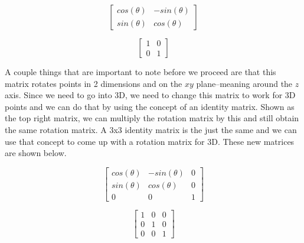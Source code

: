 \documentclass[14pt]{article}
\begin{document}
\vspace{1em}

\begin{figure}[h]
	\vspace*{1em}
	\begin{center}
		\begin{minipage}[b]{0.45\textwidth}
			\centering
			
			$$
			\begin{bmatrix}
			cos(\theta) & -sin(\theta) \\
			sin(\theta) & cos(\theta)
			\end{bmatrix}
			$$
		\end{minipage}
		\hfill
		\begin{minipage}[b]{0.45\textwidth}
			\centering
			$$
			\begin{bmatrix}
			1 & 0 \\
			0 & 1
			\end{bmatrix}			
			$$
		\end{minipage}
	\end{center}
	\vspace*{1em}
\end{figure}

\vspace{1em}

A couple things that are important to note before we proceed are that this matrix rotates points in 2 dimensions and on the $xy$ plane--meaning around the $z$ axis. Since we need to go into 3D, we need to change this matrix to work for 3D points and we can do that by using the concept of an identity matrix. Shown as the top right matrix, we can multiply the rotation matrix by this and still obtain the same rotation matrix. A 3x3 identity matrix is the just the same and we can use that concept to come up with a rotation matrix for 3D. These new matrices are shown below.

\begin{figure}[h]
	\vspace*{1em}
	\begin{center}
		\begin{minipage}[b]{0.45\textwidth}
			\centering
			
			$$
			\begin{bmatrix}
			cos(\theta) & -sin(\theta) & 0 \\
			sin(\theta) & cos(\theta) & 0 \\ 
			0 & 0 & 1
			\end{bmatrix}
			$$
		\end{minipage}
		\hfill
		\begin{minipage}[b]{0.45\textwidth}
			\centering
			$$
			\begin{bmatrix}
			1 & 0 & 0 \\
			0 & 1 & 0 \\
			0 & 0 & 1
			\end{bmatrix}			
			$$
		\end{minipage}
	\end{center}
	\vspace*{1em}
\end{figure}
\end{document}
